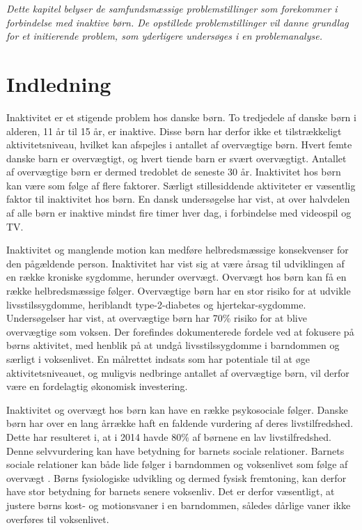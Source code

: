 \textit{Dette kapitel belyser de samfundsmæssige problemstillinger som forekommer i forbindelse med inaktive børn. De opstillede problemstillinger vil danne grundlag for et initierende problem, som yderligere undersøges i en problemanalyse.}

\section{Indledning}
Inaktivitet er et stigende problem hos danske børn. To tredjedele af danske børn i alderen, 11 år til 15 år, er inaktive\citep{SundhedsstyrrelsenFaktaark}. Disse børn har derfor ikke et tilstrækkeligt aktivitetsniveau, hvilket kan  afspejles i antallet af overvægtige børn. Hvert femte danske barn er overvægtigt, og hvert tiende barn er svært overvægtigt\citep{Universitet2014}. Antallet af overvægtige børn er dermed tredoblet de seneste 30 år\citep{Vindum2012}. Inaktivitet hos børn kan være som følge af flere faktorer. Særligt stillesiddende aktiviteter er væsentlig faktor til inaktivitet hos børn. En dansk undersøgelse har vist, at over halvdelen af alle børn er inaktive mindst fire timer hver dag, i forbindelse med videospil og TV\citep{Universitet2014}. 

Inaktivitet og manglende motion kan medføre helbredsmæssige konsekvenser for den pågældende person. Inaktivitet har vist sig at være årsag til udviklingen af en række kroniske sygdomme, herunder overvægt. Overvægt hos børn kan få en række helbredsmæssige følger. Overvægtige børn har en stor risiko for at udvikle livsstilssygdomme, heriblandt type-2-diabetes og hjertekar-sygdomme. Undersøgelser har vist, at overvægtige børn har 70\% risiko for at blive overvægtige som voksen.\citep{Reilly2006} Der forefindes dokumenterede fordele ved at fokusere på børns aktivitet, med henblik på at undgå livsstilssygdomme i barndommen og særligt i voksenlivet. En målrettet indsats som har potentiale til at øge aktivitetsniveauet, og muligvis nedbringe antallet af overvægtige børn, vil derfor være en fordelagtig økonomisk investering\citep{COWI2015}.

Inaktivitet og overvægt hos børn kan have en række psykosociale følger. Danske børn har over en lang årrække haft en faldende vurdering af deres livstilfredshed. Dette har resulteret i, at i 2014 havde 80\% af børnene en lav livstilfredshed\citep{Universitet2014}. Denne selvvurdering kan have betydning for barnets sociale relationer. Barnets sociale relationer kan både lide følger i barndommen og voksenlivet som følge af overvægt \citep{StatensInstitutforFolkesundhed2007}. \newline
Børns fysiologiske udvikling og dermed fysisk fremtoning, kan derfor have stor betydning for barnets senere voksenliv. Det er derfor væsentligt, at justere børns kost- og motionsvaner i en barndommen, således dårlige vaner ikke overføres til voksenlivet. \newpage

